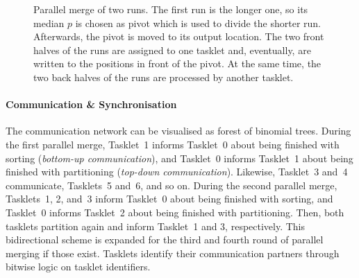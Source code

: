 \begin{figure}

	\caption{
		Parallel merge of two runs.
		The first run is the longer one, so its median \(p\) is chosen as pivot which is used to divide the shorter run.
		Afterwards, the pivot is moved to its output location.
		The two front halves of the runs are assigned to one tasklet and, eventually, are written to the positions in front of the pivot.
		At the same time, the two back halves of the runs are processed by another tasklet.
		\cite[Figure~27.6]{cormen2013algorithmen}
	}
	\label{fig:par:merge}
\end{figure}


\paragraph{Communication \& Synchronisation}
The communication network can be visualised as forest of binomial trees.
During the first parallel merge, Tasklet~1 informs Tasklet~0 about being finished with sorting (\emph{bottom-up communication}), and Tasklet~0 informs Tasklet~1 about being finished with partitioning (\emph{top-down communication}).
Likewise, Tasklet~3 and~4 communicate, Tasklets~5 and~6, and so on.
During the second parallel merge, Tasklets~1, 2, and~3 inform Tasklet~0 about being finished with sorting, and Tasklet~0 informs Tasklet~2 about being finished with partitioning.
Then, both tasklets partition again and inform Tasklet~1 and 3, respectively.
This bidirectional scheme is expanded for the third and fourth round of parallel merging if those exist.
Tasklets identify their communication partners through bitwise logic on tasklet identifiers.

